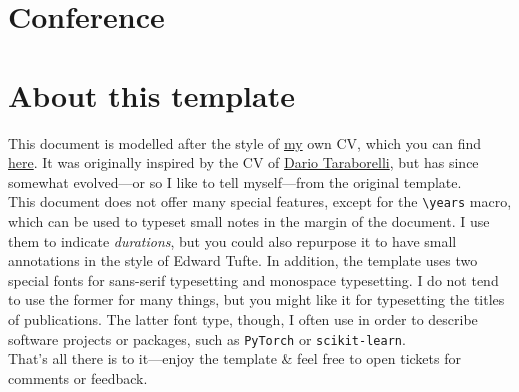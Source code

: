 \documentclass[a4paper,11pt]{article}
\newcommand{\years}[1]{%
  {\reversemarginpar\strut\marginnote{{\small#1}}}%
}
\begin{document}
\section*{Conference}


\section*{About this template}

This document is modelled after the style of
\href{https://bastian.rieck.me}{my} own CV, which you can find
\href{https://bastian.rieck.me/about/cv.pdf}{here}. It was originally
inspired by the CV of \href{http://nitens.org/taraborelli/cvtex}{Dario
Taraborelli}, but has since somewhat evolved---or so I like to tell
myself---from the original template.\\

This document does not offer many special features, except for the
\verb|\years| macro, which can be used to typeset small notes in the
margin of the document. I use them to indicate \emph{durations}, but you
could also repurpose it to have small annotations in the style of Edward
Tufte. In addition, the template uses two special fonts for sans-serif
typesetting and monospace typesetting. I do not tend to use the former
for many things, but you might like it for typesetting the titles of
publications. The latter font type, though, I often use in order to
describe software projects or packages, such as \texttt{PyTorch} or
\texttt{scikit-learn}.\\

That's all there is to it---enjoy the template \& feel free to open
tickets for comments or feedback.
\end{document}
